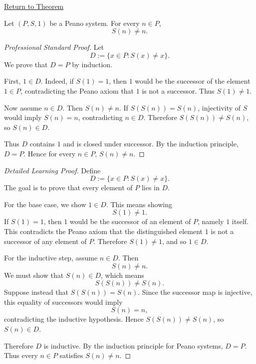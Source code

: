 \newpage
{}
\label{prf:no-object-is-its-own-successor}

\begin{remark*}[Return]
\hyperref[thm:no-object-is-its-own-successor]{Return to Theorem}
\end{remark*}

\begin{theorem*}
Let $(P,S,1)$ be a Peano system. For every $n \in P$,
\[
S(n) \neq n.
\]
\end{theorem*}

\begin{proof}[Professional Standard Proof]
\LRAProofBodyStart
Let
\[
D:=\{x\in P:S(x)\neq x\}.
\]
We prove that $D=P$ by induction.

First, $1\in D$. Indeed, if $S(1)=1$, then $1$ would be the successor of the
element $1\in P$, contradicting the Peano axiom that $1$ is not a successor.
Thus $S(1)\neq 1$.

Now assume $n\in D$. Then $S(n)\neq n$. If $S(S(n))=S(n)$, injectivity of
$S$ would imply $S(n)=n$, contradicting $n\in D$. Therefore
$S(S(n))\neq S(n)$, so $S(n)\in D$.

Thus $D$ contains $1$ and is closed under successor. By the induction
principle, $D=P$. Hence for every $n\in P$, $S(n)\neq n$.
\end{proof}

\begin{proof}[Detailed Learning Proof]
\LRAProofBodyStart
Define
\[
D:=\{x\in P:S(x)\neq x\}.
\]
The goal is to prove that every element of $P$ lies in $D$.

For the base case, we show $1\in D$. This means showing
\[
S(1)\neq 1.
\]
If $S(1)=1$, then $1$ would be the successor of an element of $P$, namely
$1$ itself. This contradicts the Peano axiom that the distinguished element
$1$ is not a successor of any element of $P$. Therefore $S(1)\neq 1$, and so
$1\in D$.

For the inductive step, assume $n\in D$. Then
\[
S(n)\neq n.
\]
We must show that $S(n)\in D$, which means
\[
S(S(n))\neq S(n).
\]
Suppose instead that $S(S(n))=S(n)$. Since the successor map is injective,
this equality of successors would imply
\[
S(n)=n,
\]
contradicting the inductive hypothesis. Hence $S(S(n))\neq S(n)$, so
$S(n)\in D$.

Therefore $D$ is inductive. By the induction principle for Peano systems,
$D=P$. Thus every $n\in P$ satisfies $S(n)\neq n$.
\end{proof}

